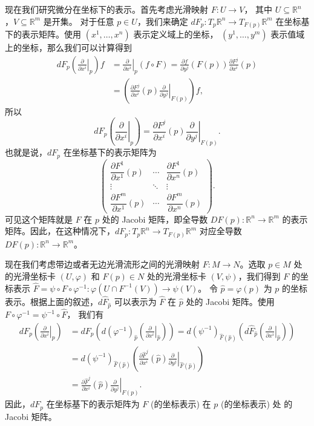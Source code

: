 \documentclass[fontset=none]{Notes}
\begin{document}
现在我们研究微分在坐标下的表示。首先考虑光滑映射 $F:U\to V$，
其中 $U\subseteq\mathbb{R}^n$，$V\subseteq\mathbb{R}^m$ 是开集。
对于任意 $p\in U$，我们来确定 $dF_p:T_p\mathbb{R}^n\to T_{F(p)}\mathbb{R}^m$
在坐标基下的表示矩阵。使用 $(x^1,\dots,x^n)$ 表示定义域上的坐标，
$(y^1,\dots,y^m)$ 表示值域上的坐标，那么我们可以计算得到
\begin{align*}
  dF_p\left(\left.\frac{\partial}{\partial x^i}\right|_p\right)f&=
  \left.\frac{\partial}{\partial x^i}\right|_p(f\circ F)=
  \frac{\partial f}{\partial y^j}(F(p))\frac{\partial F^j}{\partial x^i}(p)\\
  &=\left(\frac{\partial F^j}{\partial x^i}(p)\left.\frac{\partial}{\partial y^j}\right|_{F(p)}\right)f,
\end{align*}
所以
\begin{equation}
  dF_p\left(\left.\frac{\partial}{\partial x^i}\right|_p\right)=
  \frac{\partial F^j}{\partial x^i}(p)\left.\frac{\partial}{\partial y^j}\right|_{F(p)}.
\end{equation}
也就是说，$dF_p$ 在坐标基下的表示矩阵为
\[
  \begin{pmatrix}
    \dfrac{\partial F^1}{\partial x^1}(p) & \cdots & \dfrac{\partial F^1}{\partial x^n}(p)\\
    \vdots & \ddots & \vdots \\
    \dfrac{\partial F^m}{\partial x^1}(p) & \cdots & \dfrac{\partial F^m}{\partial x^n}(p)
  \end{pmatrix}  .
\]
可见这个矩阵就是 $F$ 在 $p$ 处的 Jacobi 矩阵，即全导数 $DF(p):\mathbb{R}^n\to\mathbb{R}^m$
的表示矩阵。因此，在这种情况下，$dF_p:T_p\mathbb{R}^n\to T_{F(p)}\mathbb{R}^m$
对应全导数 $DF(p):\mathbb{R}^n\to\mathbb{R}^m$。

现在我们考虑带边或者无边光滑流形之间的光滑映射 $F:M\to N$。选取 $p\in M$ 处
的光滑坐标卡 $(U,\varphi)$ 和 $F(p)\in N$ 处的光滑坐标卡 $(V,\psi)$，我们得到
$F$ 的坐标表示 $\hat F=\psi\circ F\circ\varphi^{-1}:\varphi(U\cap F^{-1}(V))\to \psi(V)$。
令 $\hat p=\varphi(p)$ 为 $p$ 的坐标表示。根据上面的叙述，$d\hat F_{\hat p}$
可以表示为 $\hat F$ 在 $\hat p$ 处的 Jacobi 矩阵。使用 $F\circ\varphi^{-1}=\psi^{-1}\circ\hat F$，
我们有
\begin{align*}
  dF_p\left(\left.\frac{\partial}{\partial x^i}\right|_p\right)&=
  dF_p\left(
    d(\varphi^{-1})_{\hat p}\left(
      \left.\frac{\partial}{\partial x^i}\right|_{\hat p}
    \right)
  \right)=
  d(\psi^{-1})_{\hat F(\hat p)}\left(
    d\hat F_{\hat p}\left(
      \left.\frac{\partial}{\partial x^i}\right|_{\hat p}
    \right)
  \right)\\
  &=d(\psi^{-1})_{\hat F(\hat p)}\left(
    \frac{\partial \hat F^j}{\partial x^i}(\hat p)
    \left.\frac{\partial}{\partial y^j}\right|_{\hat F(\hat p)}
  \right)\\
  &=    \frac{\partial \hat F^j}{\partial x^i}(\hat p)
  \left.\frac{\partial}{\partial y^j}\right|_{F(p)}.
\end{align*}
因此，$dF_p$ 在坐标基下的表示矩阵为 $F$ (的坐标表示) 在 $p$ (的坐标表示) 处
的 Jacobi 矩阵。
\end{document}
